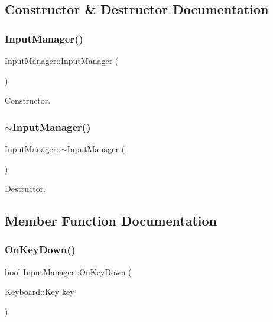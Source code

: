 \subsection{Constructor \& Destructor Documentation}
\mbox{\label{class_input_manager_a8be46886da639b26d67181c29dab6d6c}} 
\subsubsection{\texorpdfstring{Input\+Manager()}{InputManager()}}
{\footnotesize\ttfamily Input\+Manager\+::\+Input\+Manager (\begin{DoxyParamCaption}{ }\end{DoxyParamCaption})}



Constructor. 

\mbox{\label{class_input_manager_af518290877dd183606709d5852db5491}} 
\subsubsection{\texorpdfstring{$\sim$\+Input\+Manager()}{~InputManager()}}
{\footnotesize\ttfamily Input\+Manager\+::$\sim$\+Input\+Manager (\begin{DoxyParamCaption}{ }\end{DoxyParamCaption})}



Destructor. 



\subsection{Member Function Documentation}
\mbox{\label{class_input_manager_a426512406d24de8dd5f0fb2241f6ea3c}} 
\subsubsection{\texorpdfstring{On\+Key\+Down()}{OnKeyDown()}}
{\footnotesize\ttfamily bool Input\+Manager\+::\+On\+Key\+Down (\begin{DoxyParamCaption}\item[{Keyboard\+::\+Key}]{key }\end{DoxyParamCaption})}



